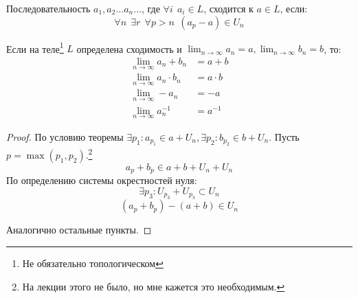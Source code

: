 \begin{definition}
    Последовательность \(a_1, a_2 \ldots a_n \ldots\), где \(\forall i \ \ a_i \in L\),
    сходится к \(a \in L\), если:
     \[\forall n \ \ \exists r \ \ \forall p > n \ \ (a_p - a) \in U_n\] 
\end{definition}

\begin{theorem}
    Если на теле\footnote{Не обязательно топологическом} \(L\) определена сходимость и \(\lim_{n \to \infty} a_n = a, \lim_{n \to \infty} b_n = b\), то:
    \begin{align*}
        \lim_{n \to \infty} a_n + b_n & = a + b \\
        \lim_{n \to \infty} a_n \cdot b_n & = a \cdot b \\
        \lim_{n \to \infty} -a_n & = -a \\
        \lim_{n \to \infty} a_n^{-1} & = a^{-1}
    \end{align*}
\end{theorem}
\begin{proof}
    По условию теоремы \(\exists p_1 : a_{p_1} \in a + U_n, \exists p_2 : b_{p_2} \in b + U_n\).
    Пусть \(p = \max(p_1, p_2)\).\footnote{На лекции этого не было, но мне кажется это необходимым.}
    \[a_p + b_p \in a + b + U_n + U_n\] 
    По определению системы окрестностей нуля:
    \[\exists p_3 : U_{p_3} + U_{p_3} \subset U_n\] 
    \[(a_p + b_p) - (a + b) \in U_n\] 

    Аналогично остальные пункты.
\end{proof}
